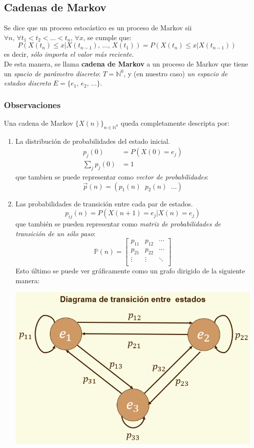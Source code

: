 \documentclass{article}
\newcommand{\comma}{,\,}                                %
\newcommand{\naturales}{\mathbb{N}}                     %
\newcommand{\sumatoria}[2]{\sum_{#1} ^{#2}}
\begin{document}
\subsection{Cadenas de Markov}
Se dice que un proceso estocástico es un proceso de Markov sii $\forall n \comma \forall t_1 < t_2 < ... < t_n \comma \forall x$, se cumple que:
\begin{equation*}
    P(X(t_n) \leq x | X(t_{n-1}) \comma ... \comma X(t_1)) = P(X(t_n) \leq x | X(t_{n-1}))
\end{equation*}
es decir, \emph{sólo importa el valor más reciente}.
\\De esta manera, se llama \textbf{cadena de Markov} a un proceso de Markov que tiene un \emph{spacio de parámetro discreto}: $T = \naturales^0$, 
y (en nuestro caso) \emph{un espacio de estados discreto} $E = \{e_1 \comma e_2 \comma ... \}$.
\subsubsection*{Observaciones}
Una cadena de Markov $\{X(n)\}_{n \in \naturales^0}$ queda completamente descripta por:
\begin{enumerate}
    \item La distribución de probabilidades del estado inicial.
    \begin{align*}
        p_j(0) &= P(X(0) = e_j) \\
        \sumatoria{j}{} p_j(0) &= 1
    \end{align*}
    que tambien se puede representar como \emph{vector de probabilidades}:
    \begin{equation*}
        \Vec{p}(n) = (p_1(n) \;\; p_2(n) \;\; ... )
    \end{equation*}
    \item Las probabilidades de transición entre cada par de estados.
    \begin{equation*}
    p_{ij}(n) = P(X(n+1) = e_j | X(n) = e_j)
    \end{equation*}
    que también se pueden representar como \emph{matriz de probabilidades de transición de un sólo paso}:
        \[
          \mathbb{P}(n) =
          \left[ {\begin{array}{cccc}
            p_{11} & p_{12} & \cdots \\
            p_{21} & p_{22} & \cdots \\
            \vdots & \vdots & \ddots \\
          \end{array} } \right]
        \]
    Esto último se puede ver gráficamente como un grafo dirigido de la siguiente manera:
    \begin{center}
            \includegraphics[width=.40\textwidth]{Images/DiagramaTransEstados.png}
    \end{center} 
\end{enumerate}
\end{document}
